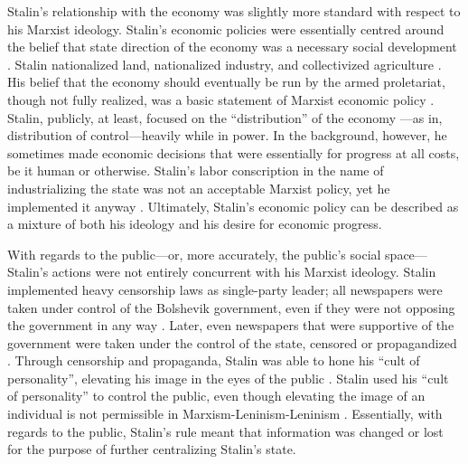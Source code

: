 \documentclass[a4paper,12pt]{article}
\begin{document}
        Stalin's relationship with the economy was slightly more standard with respect to his
        Marxist ideology. Stalin's economic policies were essentially centred around the belief that
        state direction of the economy was a necessary social development \cite[50]{remingtont}.
        Stalin nationalized land, nationalized industry, and collectivized agriculture
        \cite[50]{remingtont}. His belief that the economy should eventually be run by the armed
        proletariat, though not fully realized, was a basic statement of Marxist economic policy
        \cite[29]{reee}. Stalin, publicly, at least, focused on the ``distribution'' of the economy
        ---as in, distribution of control---heavily while in power. In the background, however, he
        sometimes made economic decisions that were essentially for progress at all costs, be it
        human or otherwise. Stalin's labor conscription in the name of industrializing the state was
        not an acceptable Marxist policy, yet he implemented it anyway \cite[49]{remingtont}.
        Ultimately, Stalin's economic policy can be described as a mixture of both his ideology and
        his desire for economic progress.

        With regards to the public---or, more accurately, the public's social space--- Stalin's
        actions were not entirely concurrent with his Marxist ideology. Stalin implemented heavy
        censorship laws as single-party leader; all newspapers were taken under control of the
        Bolshevik government, even if they were not opposing the government in any way
        \cite[47-49]{basilj}. Later, even newspapers that were supportive of the government were
        taken under the control of the state, censored or propagandized \cite[49]{basilj}. Through
        censorship and propaganda, Stalin was able to hone his ``cult of personality'', elevating
        his image in the eyes of the public \cite[718]{kuromiyah}. Stalin used his ``cult of
        personality'' to control the public, even though elevating the image of an individual is not
        permissible in Marxism-Leninism-Leninism \cite[718]{kuromiyah}. Essentially, with regards to
        the public, Stalin's rule meant that information was changed or lost for the purpose of
        further centralizing Stalin's state.
        

    \newpage
\end{document}
